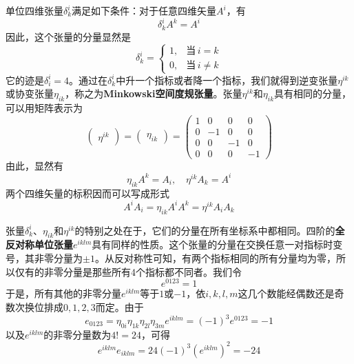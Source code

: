 单位四维张量$\delta^i_k$满足如下条件：对于任意四维矢量$A^i$，有
\begin{equation}
	\delta^i_k A^k = A^i
\end{equation}
因此，这个张量的分量显然是
\begin{equation}
	\delta^i_k = \begin{cases} 1,& \text{当}\,i=k \\ 0, &\text{当}\,i\neq k \end{cases}
\end{equation}
它的迹是$\delta^i_i = 4$。通过在$\delta^i_k$中升一个指标或者降一个指标，我们就得到逆变张量$\eta^{ik}$或协变张量$\eta_{ik}$，称之为{\bf Minkowski空间度规张量}。张量$\eta^{ik}$和$\eta_{ik}$具有相同的分量，可以用矩阵表示为
\begin{equation}
	\begin{pmatrix} \eta^{ik} \end{pmatrix} = \begin{pmatrix} \eta_{ik} \end{pmatrix} = \begin{pmatrix} 1 & 0 & 0 & 0 \\ 0 & -1 & 0 & 0 \\ 0 & 0 & -1 & 0 \\ 0 & 0 & 0 & -1 \end{pmatrix}
\end{equation}
由此，显然有
\begin{equation}
	\eta_{ik} A^k = A_i,\quad \eta^{ik} A_k = A^i
\end{equation}
两个四维矢量的标积因而可以写成形式
\begin{equation}
	A^i A_i = \eta_{ik}A^iA^k = \eta^{ik}A_iA_k
\end{equation}

张量$\delta^i_k$、$\eta_{ik}$和$\eta^{ik}$的特别之处在于，它们的分量在所有坐标系中都相同。四阶的{\bf 全反对称单位张量}$e^{iklm}$具有同样的性质。这个张量的分量在交换任意一对指标时变号，其非零分量为$\pm 1$。从反对称性可知，有两个指标相同的所有分量均为零，所以仅有的非零分量是那些所有4个指标都不同者。我们令
\begin{equation}
	e^{0123} = 1
\end{equation}
于是，所有其他的非零分量$e^{iklm}$等于$1$或$-1$，依$i,k,l,m$这几个数能经偶数还是奇数次换位排成$0,1,2,3$而定。由于
\begin{equation*}
	e_{0123} = \eta_{0i}\eta_{1k}\eta_{2l}\eta_{3m} e^{iklm} = (-1)^3e^{0123} = -1
\end{equation*}
以及$e^{iklm}$的非零分量数为$4!=24$，可得
\begin{equation}
	e^{iklm}e_{iklm} = 24(-1)^3(e^{iklm})^2 = -24
\end{equation}

